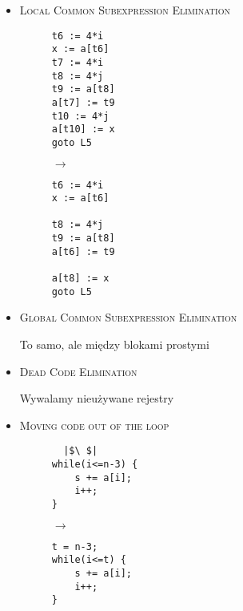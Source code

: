 \begin{itemize}
\item \textsc{Local Common Subexpression Elimination}

\begin{figure}[H]
 \begin{minipage}{0.1\textwidth}
  \centering
  \begin{verbatim}
t6 := 4*i
x := a[t6]
t7 := 4*i
t8 := 4*j
t9 := a[t8]
a[t7] := t9
t10 := 4*j
a[t10] := x
goto L5
  \end{verbatim}
 \end{minipage}
 \begin{minipage}{0.04\textwidth}
 $\rightarrow$
 \end{minipage}
 \begin{minipage}{0.2\textwidth}
  \centering
  \begin{verbatim}
t6 := 4*i
x := a[t6]

t8 := 4*j
t9 := a[t8]
a[t6] := t9

a[t8] := x
goto L5
  \end{verbatim}
 \end{minipage}
\end{figure}

\item \textsc{Global Common Subexpression Elimination}

To samo, ale między blokami prostymi

\item \textsc{Dead Code Elimination}

Wywalamy nieużywane rejestry

\item \textsc{Moving code out of the loop}

\begin{figure}[H]
 \begin{minipage}{0.15\textwidth}
  \centering
  \begin{verbatim}
  |$\ $|
while(i<=n-3) {
    s += a[i];
    i++;
}

  \end{verbatim}
 \end{minipage}
 \begin{minipage}{0.04\textwidth}
 $\rightarrow$
 \end{minipage}
 \begin{minipage}{0.2\textwidth}
  \centering
  \begin{verbatim}
t = n-3;
while(i<=t) {
    s += a[i];
    i++;
}
  \end{verbatim}
 \end{minipage}
\end{figure}


\end{itemize}

